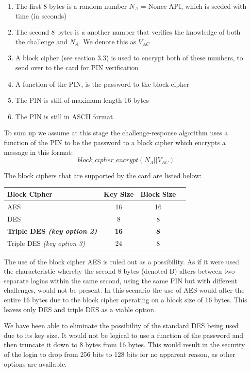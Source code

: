\documentclass[bsc,frontabs,twoside,singlespacing,parskip,deptreport]{infthesis}     %
\begin{document}
\begin{enumerate}
\item The first 8 bytes is a random number $N_A$ = Nonce API, which is seeded with time (in seconds)
\item The second 8 bytes is a another number that verifies the knowledge of both the challenge and $N_A$. We denote this as $V_{AC}$
\item A block cipher (see section 3.3) is used to encrypt both of these numbers, to send over to the card for PIN verification
\item A function of the PIN, is the password to the block cipher
\item The PIN is still of maximum length 16 bytes
\item The PIN is still in ASCII format
\end{enumerate}

To sum up we assume at this stage the challenge-response algorithm uses a function of the PIN to be the password to a block cipher which encrypts a message in this format:\\
$$ block\_cipher\_encrypt(N_A || V_{AC})$$

The block ciphers that are supported by the card are listed below:
\begin{table}[H]
\begin{tabular}{|l|c|c|c|}
\hline
Block Cipher & Key Size & Block Size\\
\hline
AES & 16 & 16\\
DES & 8 & 8\\
\textbf{Triple DES  \textit{(key option 2)}} & \textbf{16} & \textbf{8}\\
Triple DES  \textit{(key option 3)} & 24 & 8\\
\hline
\end{tabular}
\end{table}

The use of the block cipher AES is ruled out as a possibility. As if it were used the characteristic whereby the second 8 bytes (denoted B) alters between two separate logins within the same second, using the same PIN but with different challenges, would not be present. In this scenario the use of AES would alter the entire 16 bytes due to the block cipher operating on a block size of 16  bytes. This leaves only DES and triple DES as a viable option. 

We have been able to eliminate the possibility of the standard DES being used due to its key size. It would not be logical to use a function of the password and then truncate it down to 8 bytes from 16 bytes. This would result in the security of the login to drop from 256 bits to 128 bits for no apparent reason, as other options are available.
\end{document}
